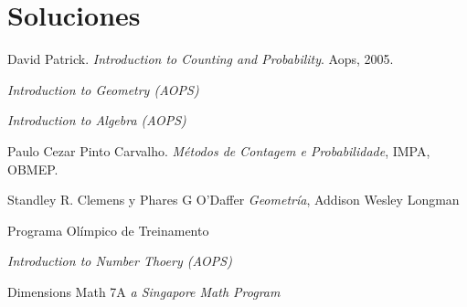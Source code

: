 \documentclass[letterpaper,11pt,oneside]{book}
\theoremstyle{definition}
\theoremstyle{remark}
\begin{document}
	
\part{Soluciones}

%

		
\begin{thebibliography}{9}
	David Patrick. \textit{Introduction to Counting and Probability}. Aops, 2005.
	
	\textit{Introduction to Geometry (AOPS)}
	
	\textit{Introduction to Algebra (AOPS)}
	
	Paulo Cezar Pinto Carvalho. \textit{Métodos de Contagem e Probabilidade}, IMPA, OBMEP.
	
	Standley R. Clemens y Phares G O'Daffer \textit{Geometría}, Addison Wesley Longman
	
	Programa Olímpico de Treinamento
	
	\textit{Introduction to Number Thoery (AOPS)}
	
	Dimensions Math 7A \textit{a Singapore Math Program} 
\end{thebibliography}
\end{document}
